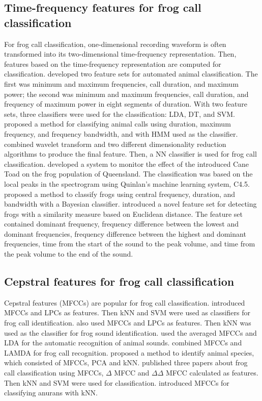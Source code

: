 \subsection{Time-frequency features for frog call classification}

For frog call classification, one-dimensional recording waveform is often transformed into its two-dimensional time-frequency representation. Then, features based on the time-frequency representation are computed for classification.
\cite{acevedo2009automated} developed two feature sets for automated animal classification. The first was minimum and maximum frequencies, call duration, and maximum power; the second was minimum and maximum frequencies, call duration, and frequency of maximum power in eight segments of duration. With two feature sets, three classifiers were used for the classification: LDA, DT, and SVM. \cite{brandes2008feature} proposed a method for classifying animal calls using duration, maximum frequency, and frequency bandwidth, and with HMM used as the classifier. \cite{yen2002automatic} combined wavelet transform and two different dimensionality reduction algorithms to produce the final feature. Then, a NN classifier is used for frog call classification. \cite{grigg1996monitoring} developed a system to monitor the effect of the introduced Cane Toad on the frog population of Queensland. The classification was based on the local peaks in the spectrogram using Quinlan's machine learning system, C4.5. \cite{Brandes2006} proposed a method to classify frogs using central frequency, duration, and bandwidth with a Bayesian classifier. \cite{croker2012using} introduced a novel feature set for detecting frogs with a similarity measure based on Euclidean distance. The feature set contained dominant frequency, frequency difference between the lowest and dominant frequencies, frequency difference between the highest and dominant frequencies, time from the start of the sound to the peak volume, and time from the peak volume to the end of the sound. 
 


\subsection{Cepstral features for frog call classification}

Cepstral features (MFCCs) are popular for frog call classification. 
 \cite{jaafarcomparative} introduced MFCCs and LPCs as features. Then kNN and SVM were used as classifiers for frog call identification. \cite{yuan2012frog} also used MFCCs and LPCs as features. Then kNN was used as the classifier for frog sound identification.
\cite{lee2006automatic} used the averaged MFCCs and LDA for the automatic recognition of animal sounds. \cite{bedoya2014automatic} combined MFCCs and LAMDA for frog call recognition. \cite{vaca2010using} proposed a method to identify animal species, which consisted of MFCCs, PCA and kNN. \cite{jaafar2013mfcc, tanintelligent2014} published three papers about frog call classification using MFCCs, $\Delta$ MFCC and $\Delta \Delta$ MFCC calculated as features. Then kNN and SVM were used for classification. \cite{feature2012Colona} introduced MFCCs for classifying anurans with kNN. 


